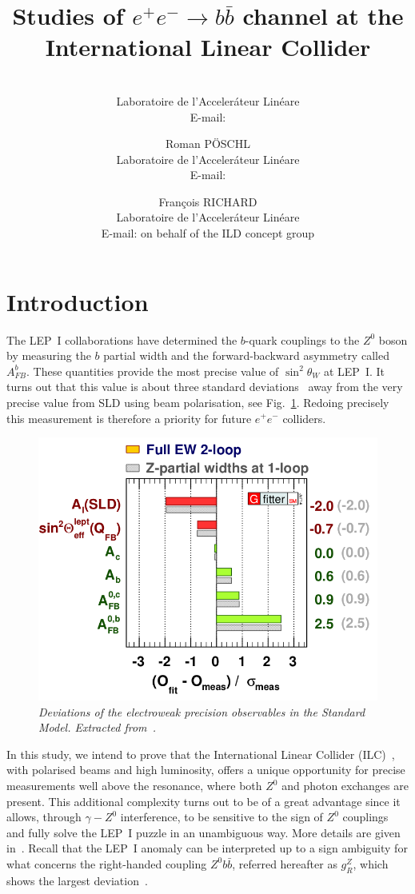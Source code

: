 \documentclass{PoS}
\title{Studies of $ e^+e^-\to b\bar{b}$ channel at the International Linear Collider}
\author{\speaker{Sviatoslav BILOKIN}\\%
        Laboratoire de l'Acceler\'ateur Lin\'eare\\
        E-mail: \email{bilokin@lal.in2p3.fr}}
\author{Roman P\"OSCHL\\
        Laboratoire de l'Acceler\'ateur Lin\'eare\\
        E-mail: \email{poeschl@lal.in2p3.fr}}
\author{Fran\c cois RICHARD\\
	Laboratoire de l'Acceler\'ateur Lin\'eare\\
	E-mail: \email{richard@lal.in2p3.fr\\
		\\}
	\hspace{20pt}on behalf of the ILD concept group}
\newcommand{\afb}{$A_{FB}^b$}
\begin{document}
\section{Introduction}
The LEP~I collaborations have determined the $b$-quark couplings to the $Z^0$ boson by measuring the $b$ partial width and the forward-backward asymmetry called \afb. These quantities provide the most precise value of $\sin^2\theta_W$ at LEP~I. It turns out that this value is about three standard deviations~\cite{Djouadi:2006rk} away from the very precise value from SLD using beam polarisation, see Fig.~\ref{fig:ewfit}. Redoing precisely this measurement is therefore a priority for future $e^+e^-$ colliders. 


\begin{figure}
	{\centering
		\includegraphics[width=0.45\linewidth]{../poster/figures/deviation2.png}
		\caption{\sl Deviations of the electroweak precision
			observables in the Standard Model. Extracted from~\cite{Djouadi:2006rk}. }
		\label{fig:ewfit}
	}
\end{figure}

In this study, we intend to prove that the International Linear Collider (ILC)~\cite{Behnke:2013xla}, with {polarised beams and high luminosity}, offers a unique opportunity for precise measurements well above the resonance, where both $Z^0$ and photon exchanges are present. 
This additional complexity turns out to be of a great advantage since it allows, through $\gamma - Z^0$ interference, to be sensitive to the sign of $Z^0$ couplings and fully solve the LEP~I puzzle in an unambiguous way. 
More details are given in~\cite{Bilokin:2017lco}.
Recall that the LEP~I anomaly can be interpreted up to a sign ambiguity for what concerns the right-handed coupling $Z^0 b\bar{b}$, referred hereafter as $g_R^Z$, which shows the largest deviation~\cite{Djouadi:2006rk}.
\end{document}
